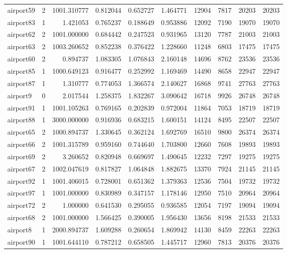 \begin{longtable}{|l|r|r|r|r|r|r|r|r|r|}
airport59 & 2 & 1001.310777 & 0.812044 & 0.652727 & 1.464771 & 12904 & 7817 & 20203 & 20203 \\
airport83 & 1 & 1.421053 & 0.765237 & 0.188649 & 0.953886 & 12092 & 7190 & 19070 & 19070 \\
airport62 & 2 & 1001.000000 & 0.684442 & 0.247523 & 0.931965 & 13120 & 7787 & 21003 & 21003 \\
airport63 & 2 & 1003.260652 & 0.852238 & 0.376422 & 1.228660 & 11248 & 6803 & 17475 & 17475 \\
airport60 & 2 & 0.894737 & 1.083305 & 1.076843 & 2.160148 & 14696 & 8762 & 23536 & 23536 \\
airport85 & 1 & 1000.649123 & 0.916477 & 0.252992 & 1.169469 & 14490 & 8658 & 22947 & 22947 \\
airport87 & 1 & 1.310777 & 0.774053 & 1.366574 & 2.140627 & 16868 & 9741 & 27763 & 27763 \\
airport9 & 0 & 2.017544 & 1.258375 & 1.832267 & 3.090642 & 16718 & 9926 & 26748 & 26748 \\
airport91 & 1 & 1001.105263 & 0.769165 & 0.202839 & 0.972004 & 11864 & 7053 & 18719 & 18719 \\
airport88 & 1 & 3000.000000 & 0.916936 & 0.683215 & 1.600151 & 14124 & 8495 & 22507 & 22507 \\
airport65 & 2 & 1000.894737 & 1.330645 & 0.362124 & 1.692769 & 16510 & 9800 & 26374 & 26374 \\
airport66 & 2 & 1001.315789 & 0.959160 & 0.744640 & 1.703800 & 12660 & 7608 & 19893 & 19893 \\
airport69 & 2 & 3.260652 & 0.820948 & 0.669697 & 1.490645 & 12232 & 7297 & 19275 & 19275 \\
airport67 & 2 & 1002.047619 & 0.817827 & 1.064848 & 1.882675 & 13370 & 7924 & 21145 & 21145 \\
airport92 & 1 & 1001.406015 & 0.728001 & 0.651362 & 1.379363 & 12536 & 7504 & 19732 & 19732 \\
airport97 & 1 & 1001.000000 & 0.830989 & 0.347157 & 1.178146 & 12950 & 7510 & 20964 & 20964 \\
airport72 & 2 & 1.000000 & 0.641530 & 0.295055 & 0.936585 & 12054 & 7197 & 19094 & 19094 \\
airport68 & 2 & 1001.000000 & 1.566425 & 0.390005 & 1.956430 & 13656 & 8198 & 21533 & 21533 \\
airport8 & 1 & 2000.894737 & 1.609288 & 0.260654 & 1.869942 & 14130 & 8459 & 22263 & 22263 \\
airport90 & 1 & 1001.644110 & 0.787212 & 0.658505 & 1.445717 & 12960 & 7813 & 20376 & 20376 \\

\end{longtable}
